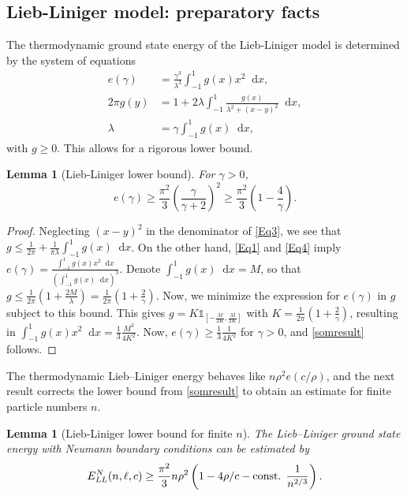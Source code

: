 \documentclass[a4paper,11pt]{article}
\newcommand*\diff{\mathop{}\!\mathrm{d}}
\newtheorem{lemma}[theorem]{Lemma}
\numberwithin{equation}{section}
\begin{document}
	\subsection{Lieb-Liniger model: preparatory facts}
	\label{secprep}
	The thermodynamic ground state energy of the Lieb-Liniger model is determined by the system of equations \cite{lieb1963exact}
	\begin{align}
 \label{Eq1}
	e(\gamma)&=\frac{\gamma^3}{\lambda^3}\int_{-1}^{1}g(x)x^2\diff x,\\
	2\pi g(y)&=1+2\lambda\int_{-1}^{1}\frac{g(x)}{\lambda^2+(x-y)^2}\diff x\label{Eq3},\\
	\lambda&=\gamma\int_{-1}^{1}g(x)\diff x,\label{Eq4}
	\end{align}
	with $g\geq0$. 
	This allows for a rigorous lower bound.
	\begin{lemma}[Lieb-Liniger lower bound] \label{LemmaLL-LowerBound}
		For $\gamma>0$,
		\begin{equation}
		\label{somresult}
		e(\gamma)\geq \frac{\pi^2}{3}\left(\frac{\gamma}{\gamma+2}\right)^2\geq \frac{\pi^2}{3}\left(1-\frac{4}{\gamma}\right).
		\end{equation}
	\end{lemma}
	\begin{proof}
		Neglecting $ (x-y)^2 $ in the denominator of \eqref{Eq3}, we see that $ g\leq \frac{1}{2\pi}+\frac{1}{\pi\lambda}\int_{-1}^{1}g(x)\diff x $. On the other hand, \eqref{Eq1} and \eqref{Eq4} imply $ e(\gamma)=\frac{\int_{-1}^{1}g(x)x^2\diff x}{\left(\int_{-1}^{1}g(x)\diff x\right)^3} $. Denote $ \int_{-1}^{1}g(x)\diff x=M $, so that $ g\leq \frac{1}{2\pi}\left(1+\frac{2M}{\lambda}\right)=\frac{1}{2\pi}\left(1+\frac{2}{\gamma}\right)$. Now, we minimize the expression for $e(\gamma)$ in $g$ subject to this bound. This gives $ g=K\mathds{1}_{[-\frac{M}{2K},\frac{M}{2K}]} $ with $ K=\frac{1}{2\pi}\left(1+\frac{2}{\gamma}\right) $, resulting in $ \int_{-1}^{1}g(x)x^2\diff x=\frac{1}{3}\frac{M^3}{4 K^2}$. Now, $e(\gamma)\geq \frac{1}{3}\frac{1}{4K^2}$ for $\gamma>0$, and \eqref{somresult} follows.
	\end{proof}
The thermodynamic Lieb--Liniger energy behaves like $n\rho^2 e(c/\rho)$, and the next result corrects the lower bound from \eqref{somresult} to obtain an estimate for finite particle numbers $n$.
	\begin{lemma}[Lieb-Liniger lower bound for finite $n$]\label{LemmaLiebLinigerNeumannLowerBound}
	The Lieb--Liniger ground state energy with Neumann boundary conditions can be estimated by
		\begin{equation}
		E_{LL}^{N}(n,\ell,c)\geq \frac{\pi^2}{3}n\rho^2\left(1-4\rho/c-\textnormal{const. }\frac{1}{n^{2/3}}\right).
		\end{equation}
	\end{lemma}
\end{document}

